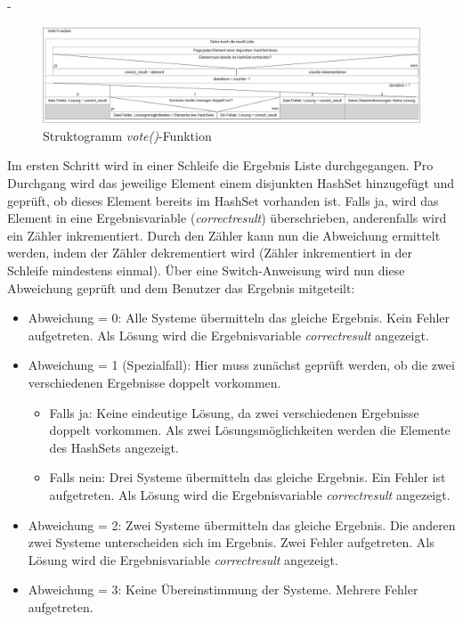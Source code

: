 -\begin{figure}[!htbp]
    \centering
    \includegraphics[width=1\linewidth]{images/vote_function_struktogramm.PNG}
    \caption{Struktogramm \textit{vote()}-Funktion}
    \label{fig:vote}
\end{figure}


 Im ersten Schritt wird in einer Schleife die Ergebnis Liste durchgegangen. Pro Durchgang wird das jeweilige Element einem disjunkten HashSet hinzugefügt und geprüft, ob dieses Element bereits im HashSet vorhanden ist. Falls ja, wird das Element in eine Ergebnisvariable (\textit{correct\textunderscore result}) überschrieben, anderenfalls wird ein Zähler inkrementiert. Durch den Zähler kann nun die Abweichung ermittelt werden, indem der Zähler dekrementiert wird (Zähler inkrementiert in der Schleife mindestens einmal). Über eine Switch-Anweisung wird nun diese Abweichung geprüft und dem Benutzer das Ergebnis mitgeteilt:
 
 \begin{itemize}
     \item Abweichung = 0: Alle Systeme übermitteln das gleiche Ergebnis. Kein Fehler aufgetreten. Als Lösung wird die Ergebnisvariable \textit{correct\textunderscore result} angezeigt.
     \item Abweichung = 1 (Spezialfall): Hier muss zunächst geprüft werden, ob die zwei verschiedenen Ergebnisse doppelt vorkommen.
     \begin{itemize}
         \item Falls ja: Keine eindeutige Lösung, da zwei verschiedenen Ergebnisse doppelt vorkommen. Als zwei Lösungsmöglichkeiten werden die Elemente des HashSets angezeigt.
         \item Falls nein: Drei Systeme übermitteln das gleiche Ergebnis. Ein Fehler ist aufgetreten. Als Lösung wird die Ergebnisvariable \textit{correct\textunderscore result} angezeigt.
     \end{itemize}
     \item Abweichung = 2: Zwei Systeme übermitteln das gleiche Ergebnis. Die anderen zwei Systeme unterscheiden sich im Ergebnis. Zwei Fehler aufgetreten. Als Lösung wird die Ergebnisvariable \textit{correct\textunderscore result} angezeigt.
     \item Abweichung = 3: Keine Übereinstimmung der Systeme. Mehrere Fehler aufgetreten.
\end{itemize}
	
